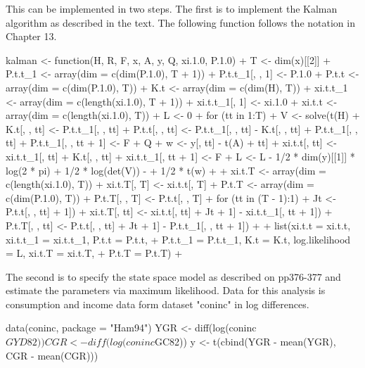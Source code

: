 \documentclass[a4paper]{article}
\begin{document}
This can be implemented in two steps.  The first is to implement the Kalman algorithm as described in the text.  The
following function follows the notation in Chapter 13.
\begin{Schunk}
\begin{Sinput}
 kalman <- function(H, R, F, x, A, y, Q, xi.1.0, P.1.0) {
+     T <- dim(x)[[2]]
+     P.t.t_1 <- array(dim = c(dim(P.1.0), T + 1))
+     P.t.t_1[, , 1] <- P.1.0
+     P.t.t <- array(dim = c(dim(P.1.0), T))
+     K.t <- array(dim = c(dim(H), T))
+     xi.t.t_1 <- array(dim = c(length(xi.1.0), T + 1))
+     xi.t.t_1[, 1] <- xi.1.0
+     xi.t.t <- array(dim = c(length(xi.1.0), T))
+     L <- 0
+     for (tt in 1:T) {
+         V <- solve(t(H) %
+         K.t[, , tt] <- P.t.t_1[, , tt] %
+         P.t.t[, , tt] <- P.t.t_1[, , tt] - K.t[, , tt] %
+             P.t.t_1[, , tt]
+         P.t.t_1[, , tt + 1] <- F %
+             Q
+         w <- y[, tt] - t(A) %
+             tt]
+         xi.t.t[, tt] <- xi.t.t_1[, tt] + K.t[, , tt] %
+         xi.t.t_1[, tt + 1] <- F %
+         L <- L - 1/2 * dim(y)[[1]] * log(2 * pi) + 1/2 * log(det(V)) - 
+             1/2 * t(w) %
+     }
+     xi.t.T <- array(dim = c(length(xi.1.0), T))
+     xi.t.T[, T] <- xi.t.t[, T]
+     P.t.T <- array(dim = c(dim(P.1.0), T))
+     P.t.T[, , T] <- P.t.t[, , T]
+     for (tt in (T - 1):1) {
+         Jt <- P.t.t[, , tt] %
+             1])
+         xi.t.T[, tt] <- xi.t.t[, tt] + Jt %
+             1] - xi.t.t_1[, tt + 1])
+         P.t.T[, , tt] <- P.t.t[, , tt] + Jt %
+             1] - P.t.t_1[, , tt + 1]) %
+     }
+     list(xi.t.t = xi.t.t, xi.t.t_1 = xi.t.t_1, P.t.t = P.t.t, 
+         P.t.t_1 = P.t.t_1, K.t = K.t, log.likelihood = L, xi.t.T = xi.t.T, 
+         P.t.T = P.t.T)
+ }
\end{Sinput}
\end{Schunk}
The second is to specify the state space model as described on pp376-377 and estimate the parameters
via maximum likelihood.  Data for this analysis is consumption and income data form dataset "coninc" in log differences.
\begin{Schunk}
\begin{Sinput}
 data(coninc, package = "Ham94")
 YGR <- diff(log(coninc$GYD82))
 CGR <- diff(log(coninc$GC82))
 y <- t(cbind(YGR - mean(YGR), CGR - mean(CGR)))
\end{Sinput}
\end{Schunk}
\end{document}
